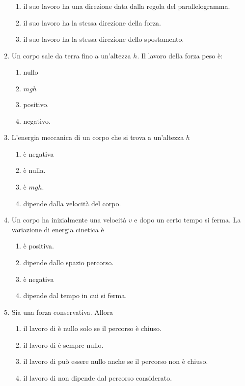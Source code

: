 \documentclass{article}
\begin{document}
\begin{enumerate}
\begin{enumerate}[label=\Alph*.]
    \item il suo lavoro ha una direzione data dalla regola del parallelogramma.
    \item il suo lavoro ha la stessa direzione della forza.
    \item il suo lavoro ha la stessa direzione dello spostamento.
  \end{enumerate}
  \item Un corpo sale da terra fino a un'altezza $h$. Il lavoro della forza peso è:
  \begin{enumerate}[label=\Alph*.]
    \item nullo
    \item $mgh$
    \item positivo.
    \item negativo.
  \end{enumerate}
  \item L'energia meccanica di un corpo che si trova a un'altezza $h$
  \begin{enumerate}[label=\Alph*.]
    \item è negativa
    \item è nulla.
    \item è $mgh$.
    \item dipende dalla velocità del corpo.
  \end{enumerate}
  \item Un corpo ha inizialmente una velocità $v$ e dopo un certo tempo si ferma. La variazione di energia cinetica è
  \begin{enumerate}[label=\Alph*.]
    \item è positiva.
    \item dipende dallo spazio percorso.
    \item è negativa
    \item dipende dal tempo in cui si ferma.
  \end{enumerate}
  \item Sia  una forza conservativa. Allora
  \begin{enumerate}[label=\Alph*.]
    \item il lavoro di  è nullo solo se il percorso è chiuso.
    \item il lavoro di  è sempre nullo.
    \item il lavoro di  può essere nullo anche se il percorso non è chiuso.
    \item il lavoro di  non dipende dal percorso considerato.
  \end{enumerate}

\end{enumerate}
\end{document}
